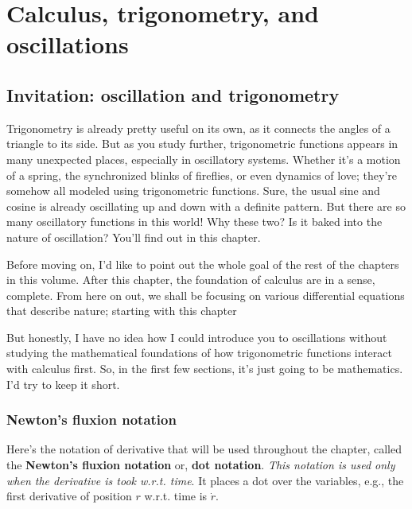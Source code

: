 \chapter{Calculus, trigonometry, and oscillations}
\label{sec:calculus-and-trigonometry}


\section{Invitation: oscillation and trigonometry}

Trigonometry is already pretty useful on its own, as it connects the angles of a triangle to its side. But as you study further, trigonometric functions appears in many unexpected places, especially in oscillatory systems. Whether it's a motion of a spring, the synchronized blinks of fireflies, or even dynamics of love; they're somehow all modeled using trigonometric functions. Sure, the usual sine and cosine is already oscillating up and down with a definite pattern. But there are so many oscillatory functions in this world! Why these two? Is it baked into the nature of oscillation? You'll find out in this chapter.

Before moving on, I'd like to point out the whole goal of the rest of the chapters in this volume. After this chapter, the foundation of calculus are in a sense, complete. From here on out, we shall be focusing on various differential equations that describe nature; starting with this chapter

But honestly, I have no idea how I could introduce you to oscillations without studying the mathematical foundations of how trigonometric functions interact with calculus first. So, in the first few sections, it's just going to be mathematics. I'd try to keep it short.

\subsection{Newton's fluxion notation}
\label{sec:newton-fluxion}

Here's the notation of derivative that will be used throughout the chapter, called the \textbf{Newton's fluxion notation} or, \textbf{dot notation}. \emph{This notation is used only when the derivative is took w.r.t. time}. It places a dot over the variables, e.g., the first derivative of position $r$ w.r.t. time is $\dot{r}$.

